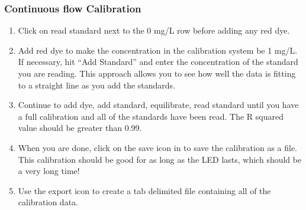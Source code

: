 \documentclass[letterpaper,10pt,english]{sphinxmanual}
\begin{document}
\subsubsection{Continuous flow Calibration}
\label{\detokenize{ProCoDA/ProCoDA:continuous-flow-calibration}}\begin{enumerate}
\item {} 
Click on read standard next to the 0 mg/L row before adding any red dye.

\item {} 
Add red dye to make the concentration in the calibration system be 1 mg/L. If necessary, hit “Add Standard” and enter the concentration of the standard you are reading. This approach allows you to see how well the data is fitting to a straight line as you add the standards.

\item {} 
Continue to add dye, add standard, equilibrate, read standard until you have a full calibration and all of the standards have been read. The R squared value should be greater than 0.99.

\item {} 
When you are done, click on the save icon in  to save the calibration as a file. This calibration should be good for as long as the LED lasts, which should be a very long time!

\item {} 
Use the export icon to create a tab delimited file containing all of the calibration data.

\end{enumerate}
\end{document}
